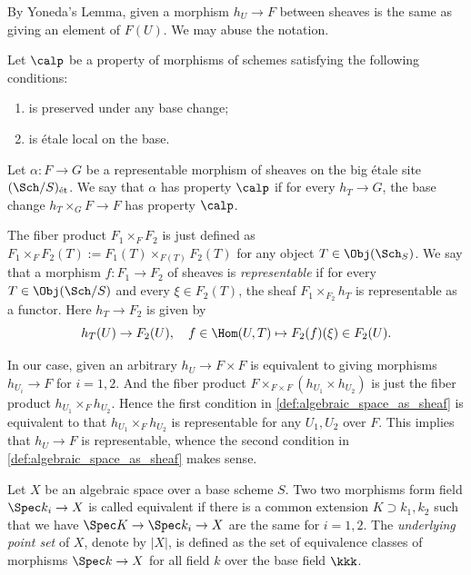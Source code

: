     \begin{remark}
        By Yoneda's Lemma, given a morphism \(h_U \to F\) between sheaves is the same as giving an element of \(F(U)\).
        We may abuse the notation.
    \end{remark}

    \begin{definition}\label{def:properties_of_sheaves_by_scheme}
        Let \(\calp\) be a property of morphisms of schemes satisfying the following conditions:
        \begin{enumerate}
            \item is preserved under any base change;
            \item is \'etale local on the base.
        \end{enumerate}
        Let \(\alpha: F \to G\) be a representable morphism of sheaves on the big \'etale site \((\Sch/S)_{\text{\'et}}\).
        We say that \(\alpha\) has property \(\calp\) if for every \(h_T \to G\), the base change \(h_T\times_{G} F \to F\) has property \(\calp\).
    \end{definition}

    \begin{remark}
        The fiber product \(F_1 \times_F F_2\) is just defined as \(F_1 \times_F F_2(T) := F_1(T) \times_{F(T)} F_2(T)\) for any object \(T \in \Obj(\Sch_S)\).
        We say that a morphism \(f: F_1 \to F_2\) of sheaves is \emph{representable} if for every \(T \in \Obj(\Sch/S)\) and every \(\xi \in F_2(T)\), the sheaf \(F_1 \times_{F_2} h_T\) is representable as a functor.
        Here \(h_T \to F_2\) is given by 
        \[ h_T(U) \to F_2(U), \quad f \in \Hom(U,T) \mapsto F_2(f)(\xi) \in F_2(U). \]

        In our case, given an arbitrary \(h_U \to F \times F\) is equivalent to giving morphisms \(h_{U_i} \to F\) for \(i=1,2\).
        And the fiber product \(F \times_{F \times F} (h_{U_1} \times h_{U_2})\) is just the fiber product \(h_{U_1} \times_{F} h_{U_2}\).
        Hence the first condition in \cref{def:algebraic_space_as_sheaf} is equivalent to that \(h_{U_1} \times_F h_{U_2}\) is representable for any \(U_1,U_2\) over \(F\).
        This implies that \(h_U \to F\) is representable, whence the second condition in \cref{def:algebraic_space_as_sheaf} makes sense.
    \end{remark}

    \begin{definition}\label{def:underlying_set_of_algebraic_space}
        Let \(X\) be an algebraic space over a base scheme \(S\).
        Two two morphisms form field \(\Spec k_i \to X\) is called equivalent if there is a common extension \(K \supset k_1,k_2\) such that we have \(\Spec K \to \Spec k_i \to X\) are the same for \(i=1,2\).
        The \emph{underlying point set} of \(X\), denote by \(|X|\), is defined as the set of equivalence classes of morphisms \(\Spec k \to X\) for all field \(k\) over the base field \(\kkk\).
    \end{definition}

